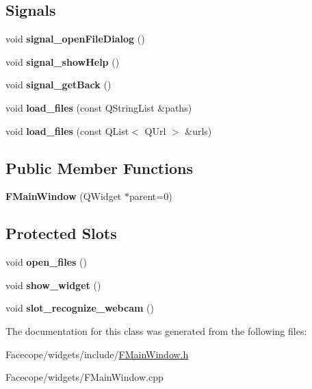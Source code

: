 \subsection*{Signals}
\begin{DoxyCompactItemize}
\item 
\mbox{\label{classFMainWindow_a42535d289ac70163aed4d818b2d5ea19}} 
void {\bfseries signal\+\_\+open\+File\+Dialog} ()
\item 
\mbox{\label{classFMainWindow_a27e577786cbea00f08362b46595b98e6}} 
void {\bfseries signal\+\_\+show\+Help} ()
\item 
\mbox{\label{classFMainWindow_a663f2f84ee547d310c01847b01c55bdc}} 
void {\bfseries signal\+\_\+get\+Back} ()
\item 
\mbox{\label{classFMainWindow_ae66529c44dc523c6d06a7961474868cf}} 
void {\bfseries load\+\_\+files} (const Q\+String\+List \&paths)
\item 
\mbox{\label{classFMainWindow_aa80aa6dbaec6530ce381a2df4ba534c0}} 
void {\bfseries load\+\_\+files} (const Q\+List$<$ Q\+Url $>$ \&urls)
\end{DoxyCompactItemize}
\subsection*{Public Member Functions}
\begin{DoxyCompactItemize}
\item 
\mbox{\label{classFMainWindow_a9ed1bc960f40fa9adec843a17df42d65}} 
{\bfseries F\+Main\+Window} (Q\+Widget $\ast$parent=0)
\end{DoxyCompactItemize}
\subsection*{Protected Slots}
\begin{DoxyCompactItemize}
\item 
\mbox{\label{classFMainWindow_af565ef83f961c2dfeb6440aad2c74597}} 
void {\bfseries open\+\_\+files} ()
\item 
\mbox{\label{classFMainWindow_a45c72bba830f8cd2e2f6770b7e01fd3c}} 
void {\bfseries show\+\_\+widget} ()
\item 
\mbox{\label{classFMainWindow_af5889340ef407af53f6174ebd1d17d94}} 
void {\bfseries slot\+\_\+recognize\+\_\+webcam} ()
\end{DoxyCompactItemize}


The documentation for this class was generated from the following files\+:\begin{DoxyCompactItemize}
\item 
Facecope/widgets/include/\hyperlink{FMainWindow_8h}{F\+Main\+Window.\+h}\item 
Facecope/widgets/F\+Main\+Window.\+cpp\end{DoxyCompactItemize}
